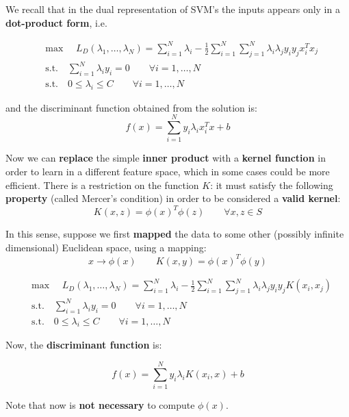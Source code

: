 We recall that in the dual representation of SVM's the inputs appears only in a \textbf{dot-product form}, i.e.

\begin{equation*}
\begin{aligned}
&\text{max }\quad L_D(\lambda_1,\dots,\lambda_N) = \sum_{i = 1}^{N}\lambda_i - \frac{1}{2}\sum_{i = 1}^{N}\sum_{j = 1}^{N}\lambda_i\lambda_jy_iy_jx_i^Tx_j\\
&\text{s.t.} \quad \sum_{i = 1}^{N}\lambda_iy_i= 0 \qquad \forall i = 1,\dots,N\\
&\text{s.t.} \quad 0 \leq \lambda_i \leq C \qquad \forall i = 1,\dots, N
\end{aligned}
\end{equation*}

and the discriminant function obtained from the solution is:
$$f(x) = \sum\limits_{i = 1}^Ny_i\lambda_ix_i^Tx +b$$

Now we can \textbf{replace} the simple \textbf{inner product} with a \textbf{kernel function} in order to learn in a different feature space, which in some cases could be more efficient. There is a restriction on the function $K$: it must satisfy the following \textbf{property} (called Mercer's condition) in order to be considered a \textbf{valid kernel}:
$$K(x,z) = \phi(x)^T\phi(z) \qquad \forall x, z \in S$$

In this sense, suppose we first \textbf{mapped} the data to some other (possibly infinite dimensional) Euclidean space, using a mapping:
$$x \rightarrow \phi(x) \qquad K(x,y) = \phi(x)^T\phi(y)$$

\begin{equation*}
\begin{aligned}
&\text{max }\quad L_D(\lambda_1,\dots,\lambda_N) = \sum_{i = 1}^{N}\lambda_i - \frac{1}{2}\sum_{i = 1}^{N}\sum_{j = 1}^{N}\lambda_i\lambda_jy_iy_jK(x_i,x_j)\\
&\text{s.t.} \quad \sum_{i = 1}^{N}\lambda_iy_i= 0 \qquad \forall i = 1,\dots,N \\
&\text{s.t.} \quad 0 \leq \lambda_i \leq C \qquad \forall i = 1,\dots,N
\end{aligned}
\end{equation*}

Now, the \textbf{discriminant function} is:

$$f(x) = \sum\limits_{i = 1}^Ny_i\lambda_iK(x_i, x) +b$$

Note that now is \textbf{not necessary} to compute $\phi(x)$.

